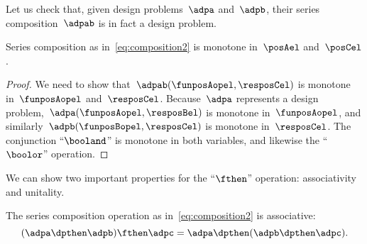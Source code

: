 
Let us check that, given design problems~$\adpa$ and~$\adpb$, their series composition~$\adpab$ is in fact a design problem.
\begin{lemma}
    Series composition as in~\cref{eq:composition2} is monotone in~$\posAel$ and~$\posCel$.
\end{lemma}
\begin{proof}
    We need to show that~$\adpab(\funposAopel,\resposCel)$ is monotone in~$\funposAopel$ and~$\resposCel$.
    Because~$\adpa$ represents a design problem,~$\adpa(\funposAopel,\resposBel)$ is monotone in~$\funposAopel$, and similarly~$\adpb(\funposBopel,\resposCel)$ is monotone in~$\resposCel$.
    The conjunction ``$\booland$'' is monotone in both variables, and likewise the ``$\boolor$'' operation.
\end{proof}

We can show two important properties for the ``$\fthen$'' operation: associativity and unitality.
\begin{lemma}
    The series composition operation as in~\cref{eq:composition2} is associative:
    \begin{equation}
        (\adpa\dpthen \adpb)
        \fthen \adpc = \adpa\dpthen (\adpb\dpthen \adpc).
    \end{equation}
\end{lemma}

